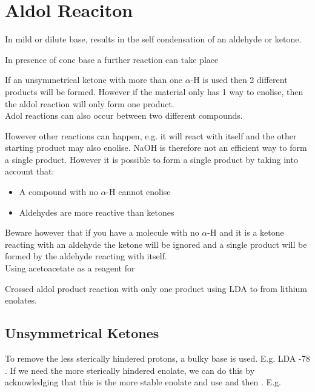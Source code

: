 \section{Aldol Reaciton}

In mild or dilute base, results in the self condensation of an aldehyde or ketone.


In presence of conc base a further reaction can take place


If an unsymmetrical ketone with more than one $\alpha$-H is used then 2 different
products will be formed. However if the material only has 1 way to enolise, then
the aldol reaction will only form one product.\\

Adol reactions can also occur between two different  compounds.


However other reactions can happen, e.g. it will react with itself and the
other starting product may also enolise. NaOH is therefore not an efficient way
to form a single product. However it is possible to form a single product by
taking into account that:
\begin{itemize}
  \item A compound with no $\alpha$-H cannot enolise
  \item Aldehydes are more reactive than ketones
\end{itemize}
Beware however that if you have a molecule with no $\alpha$-H and it is a ketone
reacting with an aldehyde the ketone will be ignored and a single product will
be formed by the aldehyde reacting with itself.\\

Using acetoacetate as a reagent for 


Crossed aldol product reaction with only one product using LDA to from lithium
enolates.


\subsection{Unsymmetrical Ketones}

To remove the less sterically hindered protons, a bulky base is used. E.g. LDA
\@ -78 \dec . If we need the more sterically hindered enolate, we can do this
by acknowledging that this is the more stable enolate and use  and
 then . E.g.

